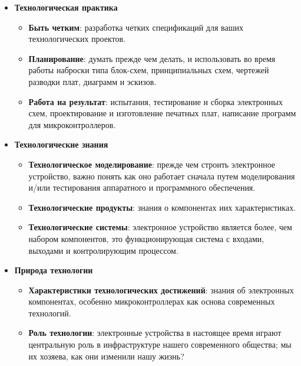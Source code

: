 \begin{itemize}

\item \textbf{Технологическая практика}

\begin{itemize}

\item\textbf{Быть четким}: разработка четких спецификаций для ваших
технологических проектов.

\item\textbf{Планирование}: думать прежде чем делать, и использовать во время
работы наброски типа блок-схем, принципиальных схем, чертежей разводки плат,
диаграмм и эскизов.

\item\textbf{Работа на результат}: испытания, тестирование и сборка электронных
схем, проектирование и изготовление печатных плат, написание программ для
микроконтроллеров.

\end{itemize}

\item \textbf{Технологические знания}

\begin{itemize}

\item\textbf{Технологическое моделирование}: прежде чем строить электронное
устройство, важно понять как оно работает сначала путем моделирования и/или
тестирования аппаратного и программного обеспечения.

\item\textbf{Технологические продукты}: знания о компонентах и ​​их
характеристиках.

\item\textbf{Технологические системы}: электронное устройство является более,
чем набором компонентов, это функционирующая система с входами, выходами и
контролирующим процессом.

\end{itemize}

\item \textbf{Природа технологии}

\begin{itemize}

\item\textbf{Характеристики технологических достижений}: знания об электронных
компонентах, особенно микроконтроллерах как основа современных технологий.

\item\textbf{Роль технологии}: электронные устройства в настоящее время играют
центральную роль в инфраструктуре нашего современного общества; мы их хозяева,
как они изменили нашу жизнь?

\end{itemize}

\end{itemize}

